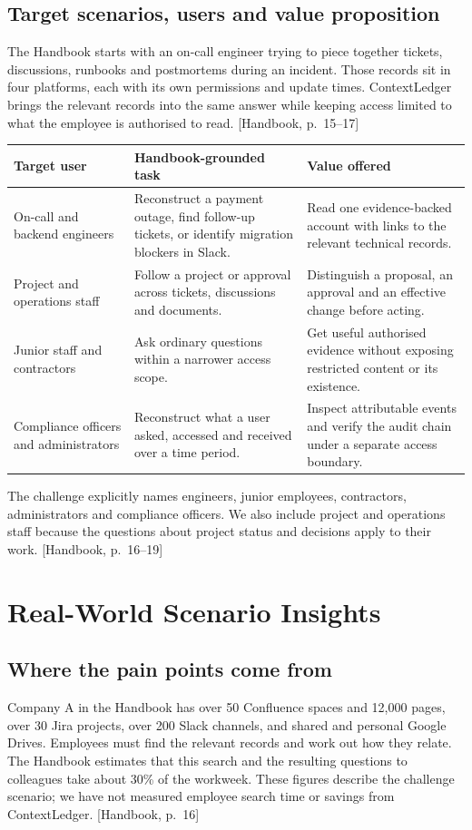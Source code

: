 \documentclass[10pt,a4paper]{article}
\newcommand{\hb}[1]{{\footnotesize\textcolor{Muted}{[Handbook, p.~#1]}}}
\begin{document}
\subsection{Target scenarios, users and value proposition}
The Handbook starts with an on-call engineer trying to piece together tickets, discussions, runbooks and postmortems during an incident. Those records sit in four platforms, each with its own permissions and update times. ContextLedger brings the relevant records into the same answer while keeping access limited to what the employee is authorised to read. \hb{15--17}

\begin{tabularx}{\linewidth}{@{}>{\raggedright\arraybackslash}p{29mm}YY@{}}
\toprule
\textbf{Target user} & \textbf{Handbook-grounded task} & \textbf{Value offered} \\
\midrule
On-call and backend engineers & Reconstruct a payment outage, find follow-up tickets, or identify migration blockers in Slack. & Read one evidence-backed account with links to the relevant technical records. \\
Project and operations staff & Follow a project or approval across tickets, discussions and documents. & Distinguish a proposal, an approval and an effective change before acting. \\
Junior staff and contractors & Ask ordinary questions within a narrower access scope. & Get useful authorised evidence without exposing restricted content or its existence. \\
Compliance officers and administrators & Reconstruct what a user asked, accessed and received over a time period. & Inspect attributable events and verify the audit chain under a separate access boundary. \\
\bottomrule
\end{tabularx}

The challenge explicitly names engineers, junior employees, contractors, administrators and compliance officers. We also include project and operations staff because the questions about project status and decisions apply to their work. \hb{16--19}

\section{Real-World Scenario Insights}
\subsection{Where the pain points come from}
Company A in the Handbook has over 50 Confluence spaces and 12,000 pages, over 30 Jira projects, over 200 Slack channels, and shared and personal Google Drives. Employees must find the relevant records and work out how they relate. The Handbook estimates that this search and the resulting questions to colleagues take about 30\% of the workweek. These figures describe the challenge scenario; we have not measured employee search time or savings from ContextLedger. \hb{16}
\end{document}
